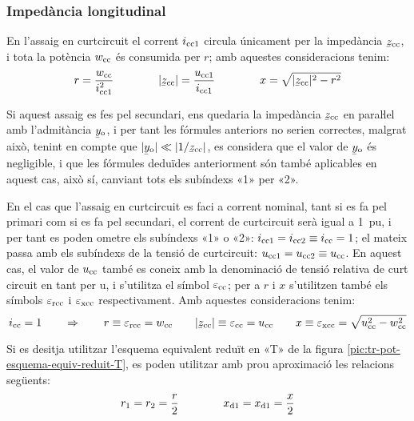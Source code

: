\subsubsection{Impedància longitudinal}

En l'assaig en curtcircuit el corrent $i_\mathrm{cc1}$ circula
únicament per la impedància $\cmplx{z}\ped{cc}$, i tota la potència
$w_\mathrm{cc}$ és consumida per $r$; amb aquestes consideracions tenim:
\begin{equation}
    r = \frac{w\ped{cc}}{i\ped{cc1}^2} \qquad\qquad
    |\cmplx{z}\ped{cc}| = \frac{u\ped{cc1}}{i\ped{cc1}} \qquad\qquad
    x = \sqrt{|\cmplx{z}\ped{cc}|^2 - r^2}
\end{equation}

Si aquest assaig es fes pel secundari, ens quedaria la impedància
$\cmplx{z}\ped{cc}$ en paraŀlel amb l'admitància
$\cmplx{y}\ped{o}$, i per tant les fórmules anteriors no serien
correctes, malgrat això, tenint en compte que $|\cmplx{y}\ped{o}| \ll
|1/\cmplx{z}\ped{cc}|$, es considera que el valor de
$\cmplx{y}\ped{o}$ és negligible, i que les fórmules deduïdes
anteriorment són també aplicables en aquest cas, això sí, canviant
tots els subíndexs «1» per «2».

En el cas que l'assaig en curtcircuit es faci a corrent nominal,
tant  si es fa pel primari  com si es fa pel secundari, el corrent
de curtcircuit serà igual a \qty{1}{pu}, i per tant es poden ometre els
subíndexs «1» o «2»: $i_\mathrm{cc1} = i_\mathrm{cc2} \equiv i_\mathrm{cc} = 1$;
el mateix passa amb els subíndexs de la tensió de curtcircuit:
$u_\mathrm{cc1} = u_\mathrm{cc2} \equiv u_\mathrm{cc}$. En aquest cas, el valor
de $u_\mathrm{cc}$ també es coneix amb la denominació de
tensió relativa de curt  circuit en tant per u, i s'utilitza  el
símbol $\varepsilon_\mathrm{cc}$; per a $r$ i $x$ s'utilitzen també els
símbols $\varepsilon_\mathrm{rcc}$ i $\varepsilon_\mathrm{xcc}$
respectivament. Amb aquestes consideracions tenim:
\begin{equation}
    i\ped{cc} = 1 \qquad \Rightarrow \qquad r \equiv \varepsilon\ped{rcc} = w\ped{cc} \qquad
    |\cmplx{z}\ped{cc}| \equiv \varepsilon\ped{cc} = u\ped{cc} \qquad
    x \equiv \varepsilon\ped{xcc} = \sqrt{u\ped{cc}^2 - w\ped{cc}^2}
    \label{eq:assaig-cc-nomianl}
\end{equation}

Si es desitja utilitzar l'esquema equivalent reduït en «T» de la figura \vref{pic:tr-pot-esquema-equiv-reduit-T}, es poden utilitzar amb prou aproximació les relacions següents:
\begin{equation}
    r_1 = r_2 = \frac{r}{2} \qquad\qquad x_\mathrm{d1} = x_\mathrm{d1} = \frac{x}{2}
\end{equation}


